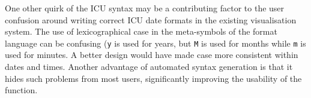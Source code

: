 One other quirk of the ICU syntax may be a contributing factor to the user confusion around writing correct ICU date formats in the existing visualisation system. The use of lexicographical case in the meta-symbols of the format language can be confusing (\eg \texttt{y} is used for years, but \texttt{M} is used for months while \texttt{m} is used for minutes. A better design would have made case more consistent within dates and times. Another advantage of automated syntax generation is that it hides such problems from most users, significantly improving the usability of the function.
